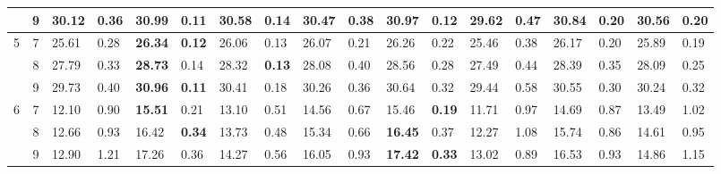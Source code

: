 \documentclass[conference]{IEEEtran}
\begin{document}
\begin{table}[]
\begin{tabular}{|cc|ll|ll|ll|ll|ll|ll|ll|ll|}
		\multicolumn{1}{|c|}{} & 9 & \multicolumn{1}{l|}{30.12} & 0.36 & \multicolumn{1}{l|}{\textbf{30.99}} & \textbf{0.11} & \multicolumn{1}{l|}{30.58} & 0.14 & \multicolumn{1}{l|}{30.47} & 0.38 & \multicolumn{1}{l|}{30.97} & 0.12 & \multicolumn{1}{l|}{29.62} & 0.47 & \multicolumn{1}{l|}{30.84} & 0.20 & \multicolumn{1}{l|}{30.56} & 0.20 \\ \hline
		\multicolumn{1}{|c|}{\multirow{3}{*}{5}} & 7 & \multicolumn{1}{l|}{25.61} & 0.28 & \multicolumn{1}{l|}{\textbf{26.34}} & \textbf{0.12} & \multicolumn{1}{l|}{26.06} & 0.13 & \multicolumn{1}{l|}{26.07} & 0.21 & \multicolumn{1}{l|}{26.26} & 0.22 & \multicolumn{1}{l|}{25.46} & 0.38 & \multicolumn{1}{l|}{26.17} & 0.20 & \multicolumn{1}{l|}{25.89} & 0.19 \\ \cline{2-18} 
		\multicolumn{1}{|c|}{} & 8 & \multicolumn{1}{l|}{27.79} & 0.33 & \multicolumn{1}{l|}{\textbf{28.73}} & 0.14 & \multicolumn{1}{l|}{28.32} & \textbf{0.13} & \multicolumn{1}{l|}{28.08} & 0.40 & \multicolumn{1}{l|}{28.56} & 0.28 & \multicolumn{1}{l|}{27.49} & 0.44 & \multicolumn{1}{l|}{28.39} & 0.35 & \multicolumn{1}{l|}{28.09} & 0.25 \\ \cline{2-18} 
		\multicolumn{1}{|c|}{} & 9 & \multicolumn{1}{l|}{29.73} & 0.40 & \multicolumn{1}{l|}{\textbf{30.96}} & \textbf{0.11} & \multicolumn{1}{l|}{30.41} & 0.18 & \multicolumn{1}{l|}{30.26} & 0.36 & \multicolumn{1}{l|}{30.64} & 0.32 & \multicolumn{1}{l|}{29.44} & 0.58 & \multicolumn{1}{l|}{30.55} & 0.30 & \multicolumn{1}{l|}{30.24} & 0.32 \\ \hline
		\multicolumn{1}{|c|}{\multirow{3}{*}{6}} & 7 & \multicolumn{1}{l|}{12.10} & 0.90 & \multicolumn{1}{l|}{\textbf{15.51}} & 0.21 & \multicolumn{1}{l|}{13.10} & 0.51 & \multicolumn{1}{l|}{14.56} & 0.67 & \multicolumn{1}{l|}{15.46} & \textbf{0.19} & \multicolumn{1}{l|}{11.71} & 0.97 & \multicolumn{1}{l|}{14.69} & 0.87 & \multicolumn{1}{l|}{13.49} & 1.02 \\ \cline{2-18} 
		\multicolumn{1}{|c|}{} & 8 & \multicolumn{1}{l|}{12.66} & 0.93 & \multicolumn{1}{l|}{16.42} & \textbf{0.34} & \multicolumn{1}{l|}{13.73} & 0.48 & \multicolumn{1}{l|}{15.34} & 0.66 & \multicolumn{1}{l|}{\textbf{16.45}} & 0.37 & \multicolumn{1}{l|}{12.27} & 1.08 & \multicolumn{1}{l|}{15.74} & 0.86 & \multicolumn{1}{l|}{14.61} & 0.95 \\ \cline{2-18} 
		\multicolumn{1}{|c|}{} & 9 & \multicolumn{1}{l|}{12.90} & 1.21 & \multicolumn{1}{l|}{17.26} & 0.36 & \multicolumn{1}{l|}{14.27} & 0.56 & \multicolumn{1}{l|}{16.05} & 0.93 & \multicolumn{1}{l|}{\textbf{17.42}} & \textbf{0.33} & \multicolumn{1}{l|}{13.02} & 0.89 & \multicolumn{1}{l|}{16.53} & 0.93 & \multicolumn{1}{l|}{14.86} & 1.15 \\ \hline

\end{tabular}
\end{table}
\end{document}
